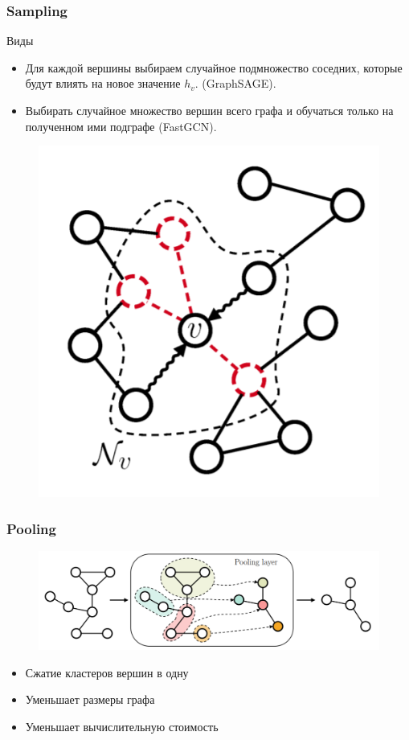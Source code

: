\documentclass{beamer}
\begin{document}
\begin{frame}
\frametitle{Sampling}
\begin{multicols}{2}
Виды
\begin{itemize}
	\item Для каждой вершины выбираем случайное подмножество соседних, которые будут влиять на новое значение $h_v$. (GraphSAGE).
	\item Выбирать случайное множество вершин всего графа и обучаться только на полученном ими подграфе (FastGCN).
\end{itemize}
	
\columnbreak
	\begin{figure}
		\includegraphics[width=\columnwidth]{sampling.png}
	\end{figure}
\end{multicols}
\end{frame}

\begin{frame}
\frametitle{Pooling}
\begin{figure}
	\includegraphics[width=\columnwidth]{pooling.png}
\end{figure}
\begin{itemize}
	\item Сжатие кластеров вершин в одну
	\item Уменьшает размеры графа
	\item Уменьшает вычислительную стоимость
\end{itemize}
\end{frame}
\end{document}
